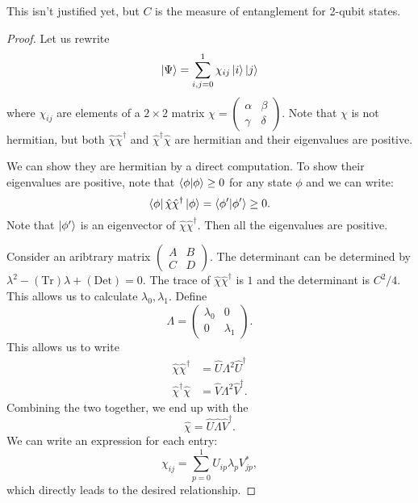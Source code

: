 \documentclass{article}
\numberwithin{equation}{section}
\begin{document}
This isn't justified yet, but $C$ is the measure of entanglement for 2-qubit states.
\begin{proof}
    Let us rewrite
    \begin{equation}
        \ket\Psi = \sum_{i,j=0}^{1}\chi_{ij}\ket i \ket j
    \end{equation}
    where $\chi_{ij}$ are elements of a $2\times 2$ matrix $\chi = \begin{pmatrix}
        \alpha & \beta \\ \gamma & \delta
    \end{pmatrix}.$ Note that $\chi$ is not hermitian, but both $\hat{\chi}\hat{\chi}^\dagger$ and $\hat{\chi}^\dagger\hat{\chi}$ are hermitian and their eigenvalues are positive.

    We can show they are hermitian by a direct computation. To show their eigenvalues are positive, note that $\bra{\phi}\ket{\phi} \ge 0$ for any state $\phi$ and we can write:
    \begin{equation}
        \bra{\phi}\hat{\chi}\hat{\chi}^\dagger\ket{\phi} = \bra{\phi'}\ket{\phi'} \ge 0.
    \end{equation} 
    Note that $\ket{\phi'}$ is an eigenvector of $\hat{\chi}\hat{\chi}^\dagger.$ Then all the eigenvalues are positive.

    Consider an aribtrary matrix $\begin{pmatrix}
        A & B \\ C & D
    \end{pmatrix}.$ The determinant can be determined by $\lambda^2 - (\text{Tr})\lambda + (\text{Det}) = 0.$ The trace of $\hat{\chi}\hat{\chi}^\dagger$ is $1$ and the determinant is $C^2/4.$ This allows us to calculate $\lambda_0,\lambda_1$. Define
    \begin{equation}
        \Lambda = \begin{pmatrix}
            \lambda_0 & 0 \\ 
            0 & \lambda_1
        \end{pmatrix}.
    \end{equation}
    This allows us to write
    \begin{align*}
        \hat{\chi}\hat{\chi}^\dagger &= \hat{U}\Lambda^2\hat{U}^\dagger \\ 
        \hat{\chi}^\dagger\hat{\chi} &= \hat{V}\Lambda^2\hat{V}^\dagger.
    \end{align*}
    Combining the two together, we end up with the 
    \begin{equation}
        \hat{\chi} = \hat{U}\hat{\Lambda}\hat{V}^\dagger. 
    \end{equation}
    We can write an expression for each entry:
    \begin{equation}
        \chi_{ij} = \sum_{p=0}^{1}U_{ip}\lambda_p V_{jp}^*,
    \end{equation}
    which directly leads to the desired relationship.
\end{proof}
\end{document}
